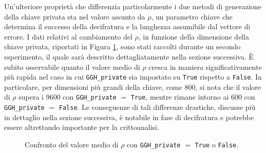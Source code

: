 Un'ulteriore proprietà che differenzia particolarmente i due metodi di generazione della 
chiave privata sta nel valore assunto da $\rho$, un parametro chiave che determina il 
successo della decifratura e la lunghezza assumibile dal vettore di errore. 
I dati relativi al cambiamento del $\rho$, in funzione della dimensione della chiave privata, riportati in 
Figura \ref{fig:rho_comparison}, sono stati raccolti durante un secondo esperimento, 
il quale sarà descritto dettagliatamente nella sezione successiva. 
È subito osservabile quanto il valore medio di $\rho$ cresca in maniera significativamente 
più rapida nel caso in cui \texttt{GGH\_private} sia impostato su \texttt{True} rispetto a 
\texttt{False}. In particolare, per dimensioni più grandi della chiave, come 800, si nota 
che il valore di $\rho$ supera i 9600 con \texttt{GGH\_private} $=$ \texttt{True}, mentre 
rimane intorno ai 600 con \texttt{GGH\_private} $=$ \texttt{False}. Le conseguenze di 
tali differenze drastiche, discusse più in dettaglio nella sezione successiva, è notabile 
in fase di decifratura e potrebbe essere altrettando importante per la crittoanalisi. 


\begin{figure}[H]
    \centering
    \pgfplotsset{scaled y ticks=false}
    \caption{Confronto del valore medio di $\rho$ con \texttt{GGH\_private} $=$ \texttt{True} o \texttt{False}.}
    \label{fig:rho_comparison}
\end{figure}



